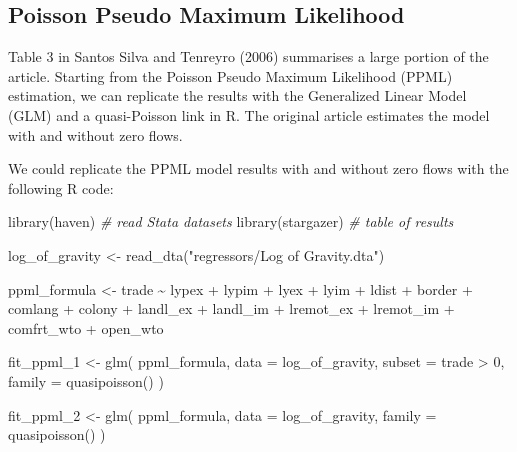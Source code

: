 \documentclass[letterpaper,twoside,12pt]{article}
\newenvironment{Shaded}{\begin{snugshade}}{\end{snugshade}}
\newcommand{\AttributeTok}[1]{\textcolor[rgb]{0.77,0.63,0.00}{#1}}
\newcommand{\CommentTok}[1]{\textcolor[rgb]{0.56,0.35,0.01}{\textit{#1}}}
\newcommand{\DecValTok}[1]{\textcolor[rgb]{0.00,0.00,0.81}{#1}}
\newcommand{\FunctionTok}[1]{\textcolor[rgb]{0.00,0.00,0.00}{#1}}
\newcommand{\NormalTok}[1]{#1}
\newcommand{\OtherTok}[1]{\textcolor[rgb]{0.56,0.35,0.01}{#1}}
\newcommand{\SpecialCharTok}[1]{\textcolor[rgb]{0.00,0.00,0.00}{#1}}
\newcommand{\StringTok}[1]{\textcolor[rgb]{0.31,0.60,0.02}{#1}}
\begin{document}
\subsection{Poisson Pseudo Maximum
Likelihood}\label{poisson-pseudo-maximum-likelihood}

Table 3 in Santos Silva and Tenreyro (2006) summarises a large portion
of the article. Starting from the Poisson Pseudo Maximum Likelihood
(PPML) estimation, we can replicate the results with the Generalized
Linear Model (GLM) and a quasi-Poisson link in R. The original article
estimates the model with and without zero flows.

We could replicate the PPML model results with and without zero flows
with the following R code:

\begin{Shaded}
\begin{Highlighting}[]
\FunctionTok{library}\NormalTok{(haven) }\CommentTok{\# read Stata datasets}
\FunctionTok{library}\NormalTok{(stargazer) }\CommentTok{\# table of results}

\NormalTok{log\_of\_gravity }\OtherTok{\textless{}{-}} \FunctionTok{read\_dta}\NormalTok{(}\StringTok{"regressors/Log of Gravity.dta"}\NormalTok{)}

\NormalTok{ppml\_formula }\OtherTok{\textless{}{-}}\NormalTok{ trade }\SpecialCharTok{\textasciitilde{}}\NormalTok{ lypex }\SpecialCharTok{+}\NormalTok{ lypim }\SpecialCharTok{+}\NormalTok{ lyex }\SpecialCharTok{+}\NormalTok{ lyim }\SpecialCharTok{+}\NormalTok{ ldist }\SpecialCharTok{+}\NormalTok{ border }\SpecialCharTok{+}
\NormalTok{  comlang }\SpecialCharTok{+}\NormalTok{ colony }\SpecialCharTok{+}\NormalTok{ landl\_ex }\SpecialCharTok{+}\NormalTok{ landl\_im }\SpecialCharTok{+}\NormalTok{ lremot\_ex }\SpecialCharTok{+}\NormalTok{ lremot\_im }\SpecialCharTok{+}
\NormalTok{  comfrt\_wto }\SpecialCharTok{+}\NormalTok{ open\_wto}

\NormalTok{fit\_ppml\_1 }\OtherTok{\textless{}{-}} \FunctionTok{glm}\NormalTok{(}
\NormalTok{  ppml\_formula,}
  \AttributeTok{data =}\NormalTok{ log\_of\_gravity,}
  \AttributeTok{subset =}\NormalTok{ trade }\SpecialCharTok{\textgreater{}} \DecValTok{0}\NormalTok{,}
  \AttributeTok{family =} \FunctionTok{quasipoisson}\NormalTok{()}
\NormalTok{)}

\NormalTok{fit\_ppml\_2 }\OtherTok{\textless{}{-}} \FunctionTok{glm}\NormalTok{(}
\NormalTok{  ppml\_formula,}
  \AttributeTok{data =}\NormalTok{ log\_of\_gravity,}
  \AttributeTok{family =} \FunctionTok{quasipoisson}\NormalTok{()}
\NormalTok{)}
\end{Highlighting}
\end{Shaded}
\end{document}
